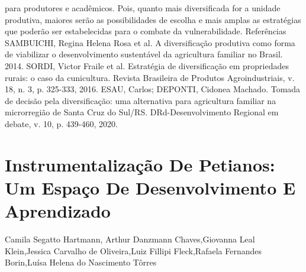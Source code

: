 para produtores e acadêmicos. Pois, quanto mais diversificada for a unidade produtiva, maiores
serão as possibilidades de escolha e mais amplas as estratégias que poderão ser estabelecidas
para o combate da vulnerabilidade.
Referências
SAMBUICHI, Regina Helena Rosa et al. A diversificação produtiva como forma de viabilizar o
desenvolvimento sustentável da agricultura familiar no Brasil. 2014.
SORDI, Victor Fraile et al. Estratégia de diversificação em propriedades rurais: o caso da
cunicultura. Revista Brasileira de Produtos Agroindustriais, v. 18, n. 3, p. 325-333, 2016.
ESAU, Carlos; DEPONTI, Cidonea Machado. Tomada de decisão pela diversificação: uma
alternativa para agricultura familiar na microrregião de Santa Cruz do Sul/RS.
DRd-Desenvolvimento Regional em debate, v. 10, p. 439-460, 2020.




\section*{Instrumentalização De Petianos: Um Espaço De Desenvolvimento E Aprendizado}

Camila Segatto Hartmann, Arthur Danzmann Chaves,Giovanna Leal Klein,Jessica Carvalho de Oliveira,Luiz Fillipi Fleck,Rafaela Fernandes Borin,Luísa Helena do Nascimento Tôrres

